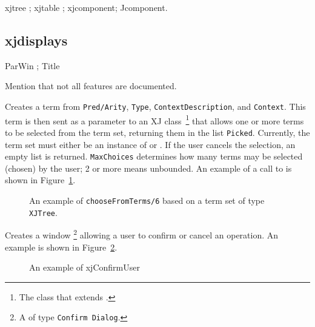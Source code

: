 xjtree ; xjtable ; xjcomponent; Jcomponent.

\subsection{xjdisplays}

ParWin ; Title

Mention that not all features are documented.

\begin{description}

%
Creates a  term from {\tt Pred/Arity}, {\tt Type},
{\tt ContextDescription}, and {\tt Context}.  This term is then sent
as a parameter to an XJ class~\footnote{The
 class that extends .} that
allows one or more terms to be selected from the term set, returning
them in the list {\tt Picked}.  Currently, the term set must either be
an instance of  or .  If the user
cancels the selection, an empty list is returned.  {\tt MaxChoices}
determines how many terms may be selected (chosen) by the user; 2 or
more means unbounded.  An example of a call to
 is shown in Figure~\ref{fig:chooseFromTerms}.

\begin{figure}[htbp] \label{fig:chooseFromTerms}
\caption{An example of {\tt chooseFromTerms/6} based on a term set of type {\tt XJTree}.}
\end{figure}

%
Creates a window \footnote{A  of type
{\tt Confirm Dialog}.} allowing a user to confirm or cancel an
operation.  An example is shown in Figure~\ref{fig:xjConfirmUser}.

\begin{figure}[htbp] \label{fig:xjConfirmUser}
\caption{An example of xjConfirmUser}
\end{figure}


\end{description}
